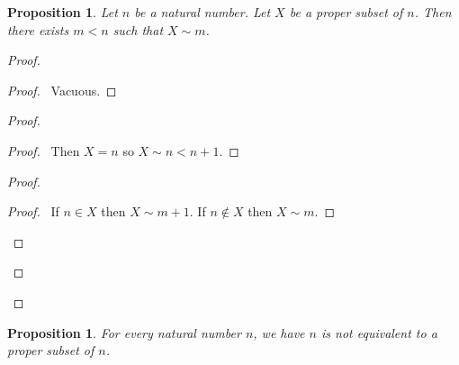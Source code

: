\documentclass{report}
\let\qed\relax
\newtheorem{prop}[ax]{Proposition}
\theoremstyle{definition}
\begin{document}
\begin{prop}
\label{prop:subset_finite}
Let $n$ be a natural number. Let $X$ be a proper subset of $n$. Then there exists $m < n$ such that $X \sim m$.
\end{prop}

\begin{proof}
\pf
{}
\begin{proof}
	\pf\ Vacuous.
\end{proof}
\begin{proof}
	\begin{proof}
		\pf\ Then $X = n$ so $X \sim n < n+1$.
	\end{proof}
	\begin{proof}
		\begin{proof}
			\pf\ If $n \in X$ then $X \sim m + 1$. If $n \notin X$ then $X \sim m$.
		\end{proof}
	\end{proof}
\end{proof}
\qed
\end{proof}

\begin{prop}
\label{prop:pigeonhole}
For every natural number $n$, we have $n$ is not equivalent to a proper subset of $n$.
\end{prop}
\end{document}
